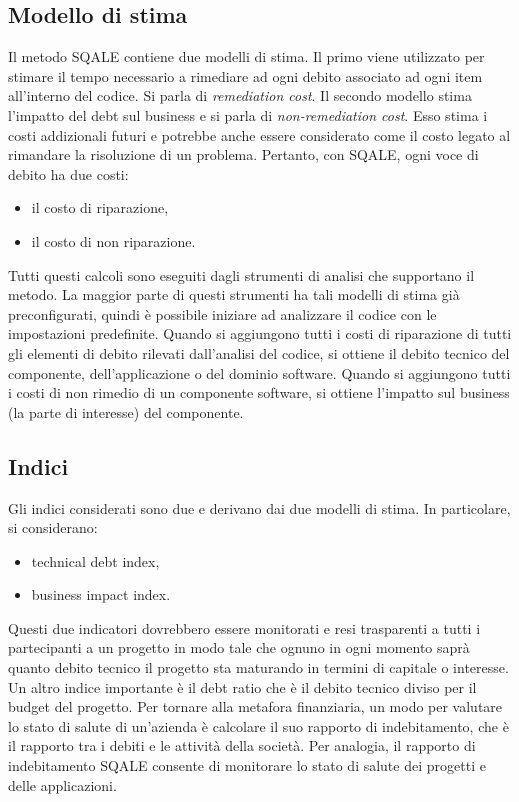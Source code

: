 \subsection{Modello di stima}
Il metodo SQALE contiene due modelli di stima. Il primo viene utilizzato per stimare il tempo necessario a rimediare ad ogni debito associato ad ogni item all'interno del codice. Si parla di \textit{remediation cost}. Il secondo modello stima l'impatto del debt sul business e si parla di \textit{non-remediation cost}. Esso stima i costi addizionali futuri e  potrebbe anche essere considerato come il costo legato al rimandare la risoluzione di un problema.
Pertanto, con SQALE, ogni voce di debito ha due costi:
\begin{itemize}
	\item il costo di riparazione,
	\item il costo di non riparazione.
\end{itemize}
Tutti questi calcoli sono eseguiti dagli strumenti di analisi che supportano il metodo.
La maggior parte di questi strumenti ha tali modelli di stima già preconfigurati, quindi è possibile iniziare ad analizzare il codice con le impostazioni predefinite.
Quando si aggiungono tutti i costi di riparazione di tutti gli elementi di debito rilevati dall'analisi del codice, si ottiene il debito tecnico del componente, dell'applicazione o del dominio software. Quando si aggiungono tutti i costi di non rimedio di un componente software, si ottiene l'impatto sul business (la parte di interesse) del componente.
\subsection{Indici}
Gli indici considerati sono due e derivano dai due modelli di stima. In particolare, si considerano:
\begin{itemize}
	\item technical debt index,
	\item business impact index.
\end{itemize}
Questi due indicatori dovrebbero essere monitorati e resi trasparenti a tutti i partecipanti a un progetto in modo tale che ognuno in ogni momento saprà quanto debito tecnico il progetto sta maturando in termini di capitale o interesse. \\ Un altro indice importante è il debt ratio che è il debito tecnico diviso per il budget del progetto. Per tornare alla metafora finanziaria, un modo per valutare lo stato di salute di un'azienda è calcolare il suo rapporto di indebitamento, che è il rapporto tra i debiti e le attività della società. Per analogia, il rapporto di indebitamento SQALE consente di monitorare lo stato di salute dei progetti e delle applicazioni.
